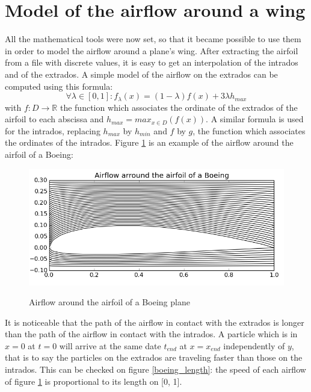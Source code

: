 \documentclass{article}
\begin{document}
\section{Model of the airflow around a wing}

All the mathematical tools were now set, so that it became possible to use them in order to model the airflow around a plane's wing. After extracting the airfoil from a file with discrete values, it is easy to get an interpolation of the intrados and of the extrados. A simple model of the airflow on the extrados can be computed using this formula:
\begin{equation}
\forall \lambda \in [0,1]: f_{\lambda}(x) = (1-\lambda)f(x) + 3\lambda h_{max}
\end{equation}
with $f: D \to \mathbb{R}$ the function which associates the ordinate of the extrados of the airfoil to each abscissa and $h_{max} = max_{x \in D}(f(x))$. A similar formula is used for the intrados, replacing $h_{max}$ by $h_{min}$ and $f$ by $g$, the function which associates the ordinates of the intrados. Figure \ref{boeing_airflow} is an example of the airflow around the airfoil of a Boeing:

\begin{figure}[h]
  \centering
  \caption{Airflow around the airfoil of a Boeing plane}
  \includegraphics[width=14cm]{boeing_airflow}
  \label{boeing_airflow}
\end{figure}

\newpage

It is noticeable that the path of the airflow in contact with the extrados is longer than the path of the airflow in contact with the intrados. A particle which is in $x = 0$ at $t = 0$ will arrive at the same date $t_{end}$ at $x = x_{end}$ independently of $y$, that is to say the particles on the extrados are traveling faster than those on the intrados. This can be checked on figure \ref{boeing_length}: the speed of each airflow of figure \ref{boeing_airflow} is proportional to its length on [0, 1].
\end{document}
